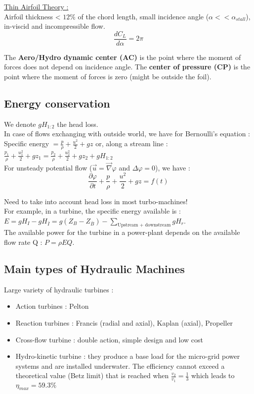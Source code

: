 \documentclass[../main.tex]{subfiles}
\begin{document}
\quad \underline{Thin Airfoil Theory :}\\
Airfoil thickness < $12\%$ of the chord length, small incidence angle ($\alpha<<\alpha_{stall}$), in-viscid and incompressible flow. \begin{equation}
    \frac{dC_L}{d\alpha} = 2\pi
\end{equation}

The \textbf{Aero/Hydro dynamic center (AC)} is the point where the moment of forces does not depend on incidence angle. The \textbf{center of pressure (CP)} is the point where the moment of forces is zero (might be outside the foil).\\

\subsection{Energy conservation}
We denote $gH_{1:2}$ the head loss.\\
In case of flows exchanging with outside world, we have for Bernoulli's equation : Specific energy $= \frac{p}{\rho} + \frac{u^2}{2} + gz$ or, along a stream line : $\frac{p_1}{\rho} + \frac{u_1^2}{2} + gz_1 = \frac{p_2}{\rho} + \frac{u_2^2}{2} + gz_2 + gH_{1:2}$\\

For unsteady potential flow ($\Vec{u} = \Vec{\nabla} \varphi$ and $\Delta \varphi = 0$), we have : \begin{equation}
    \frac{\partial \varphi}{\partial t} + \frac{p}{\rho} + \frac{u^2}{2} + gz = f(t)
\end{equation}

\warning Need to take into account head loss in most turbo-machines!\\
For example, in a turbine, the specific energy available is : $E = gH_I - gH_{\overline{I}} = g(Z_B - Z_{\overline{B}}) - \sum_{\text{Upstream + downstream}} gH_r$.\\
The available power for the turbine in a power-plant depends on the available flow rate Q : $P = \rho E Q$.\\

\subsection{Main types of Hydraulic Machines}
Large variety of hydraulic turbines : \begin{itemize}
    \item Action turbines : Pelton
    \item Reaction turbines : Francis (radial and axial), Kaplan (axial), Propeller
    \item Cross-flow turbine : double action, simple design and low cost
    \item Hydro-kinetic turbine : they produce a base load for the micro-grid power systems and are installed underwater. The efficiency cannot exceed a theoretical value (Betz limit) that is reached when $\frac{v_2}{v_1} = \frac{1}{3}$ which leads to $\eta_{max} = 59.3\%$
\end{itemize}
\end{document}
